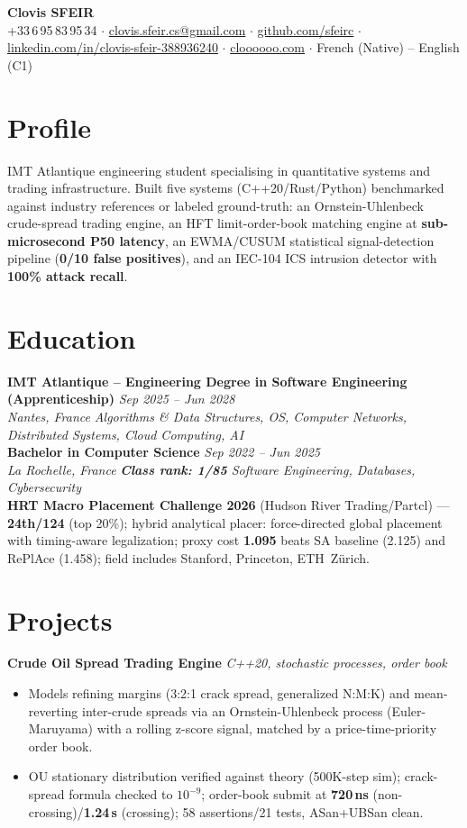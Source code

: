 \documentclass[10pt]{article}
\newcommand{\entry}[4]{%
  \noindent\textbf{#1} \hfill \textit{#2} \\
  \textit{#3} \hfill \textit{#4}\\[-0.3em]
}
\newcommand{\projectentry}[2]{%
  \noindent\textbf{#1} \hfill \textit{#2}\\[-0.3em]
}
\begin{document}
\fontsize{9.3pt}{11pt}\selectfont
\begin{center}
  {\LARGE \textbf{Clovis SFEIR}}\\[0.3em]
  +33\,6\,95\,83\,95\,34 \;$\cdot$\; \href{mailto:clovis.sfeir.cs@gmail.com}{clovis.sfeir.cs@gmail.com} \;$\cdot$\;
  \href{https://github.com/sfeirc}{github.com/sfeirc} \;$\cdot$\;
  \href{https://linkedin.com/in/clovis-sfeir-388936240}{linkedin.com/in/clovis-sfeir-388936240} \;$\cdot$\;
  \href{https://cloooooo.com}{cloooooo.com} \;$\cdot$\; French (Native) -- English (C1)
\end{center}

\section*{Profile}
IMT Atlantique engineering student specialising in quantitative systems and trading infrastructure. Built five systems (C++20/Rust/Python) benchmarked against industry references or labeled ground-truth: an Ornstein-Uhlenbeck crude-spread trading engine, an HFT limit-order-book matching engine at \textbf{sub-microsecond P50 latency}, an EWMA/CUSUM statistical signal-detection pipeline (\textbf{0/10 false positives}), and an IEC-104 ICS intrusion detector with \textbf{100\% attack recall}.

\section*{Education}
\entry{IMT Atlantique -- Engineering Degree in Software Engineering (Apprenticeship)}{Sep 2025 -- Jun 2028}{Nantes, France}{Algorithms \& Data Structures, OS, Computer Networks, Distributed Systems, Cloud Computing, AI}
\entry{Bachelor in Computer Science}{Sep 2022 -- Jun 2025}{La Rochelle, France}{\textbf{Class rank: 1/85} \textbar{} Software Engineering, Databases, Cybersecurity}
\noindent\textbf{HRT Macro Placement Challenge 2026} (Hudson River Trading/Partcl) --- \textbf{24th/124} (top 20\%); hybrid analytical placer: force-directed global placement with timing-aware legalization; proxy cost \textbf{1.095} beats SA baseline (2.125) and RePlAce (1.458); field includes Stanford, Princeton, ETH~Z\"urich.

\section*{Projects}

\projectentry{Crude Oil Spread Trading Engine}{C++20, stochastic processes, order book}
\begin{itemize}
  \item Models refining margins (3:2:1 crack spread, generalized N:M:K) and mean-reverting inter-crude spreads via an Ornstein-Uhlenbeck process (Euler-Maruyama) with a rolling z-score signal, matched by a price-time-priority order book.
  \item OU stationary distribution verified against theory (500K-step sim); crack-spread formula checked to $10^{-9}$; order-book submit at \textbf{720\,ns} (non-crossing)/\textbf{1.24\,\textmu s} (crossing); 58 assertions/21 tests, ASan+UBSan clean.
\end{itemize}
\end{document}
